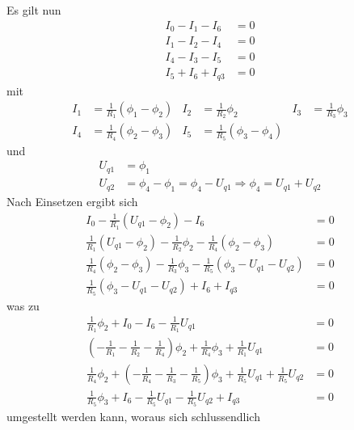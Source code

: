 \documentclass{article}
\begin{document}
Es gilt nun
\begin{align*}
    I_0 - I_1 - I_6 &= 0 \\
    I_1 - I_2 - I_4 &= 0 \\
    I_4 - I_3 - I_5 &= 0 \\
    I_5 + I_6 + I_{q3} &= 0
\end{align*}
mit
\begin{align*}
    I_1 &= \frac{1}{R_1}(\phi_1 - \phi_2) &
    I_2 &= \frac{1}{R_2}\phi_2 &
    I_3 &= \frac{1}{R_3}\phi_3 \\
    I_4 &= \frac{1}{R_4}(\phi_2 - \phi_3) &
    I_5 &= \frac{1}{R_5}(\phi_3 - \phi_4)
\end{align*}
und
\begin{align*}
    U_{q1} &= \phi_1 \\
    U_{q2} &= \phi_4 - \phi_1 = \phi_4 - U_{q1} \Rightarrow \phi_4 = U_{q1} + U_{q2}
\end{align*}
Nach Einsetzen ergibt sich
\begin{align*}
    I_0 - \frac{1}{R_1}(U_{q1} - \phi_2) - I_6 &= 0 \\
    \frac{1}{R_1}(U_{q1} - \phi_2) - \frac{1}{R_2}\phi_2 - \frac{1}{R_4}(\phi_2 - \phi_3) &= 0 \\
    \frac{1}{R_4}(\phi_2 - \phi_3) - \frac{1}{R_3}\phi_3 - \frac{1}{R_5}(\phi_3 - U_{q1} - U_{q2}) &= 0 \\
    \frac{1}{R_5}(\phi_3 - U_{q1} - U_{q2}) + I_6 + I_{q3} &= 0
\end{align*}
was zu
\begin{align*}
    \frac{1}{R_1}\phi_2 + I_0 - I_6 - \frac{1}{R_1}U_{q1}  &= 0 \\
    \left(-\frac{1}{R_1} - \frac{1}{R_2} - \frac{1}{R_4}\right)\phi_2 + \frac{1}{R_4}\phi_3 + \frac{1}{R_1}U_{q1} &= 0 \\
    \frac{1}{R_4}\phi_2 + \left(-\frac{1}{R_4} - \frac{1}{R_3} - \frac{1}{R_5}\right)\phi_3 + \frac{1}{R_5}U_{q1} + \frac{1}{R_5}U_{q2} &= 0 \\
    \frac{1}{R_5}\phi_3 + I_6 - \frac{1}{R_5}U_{q1} - \frac{1}{R_5}U_{q2} + I_{q3} &= 0
\end{align*}
umgestellt werden kann, woraus sich schlussendlich
\end{document}
